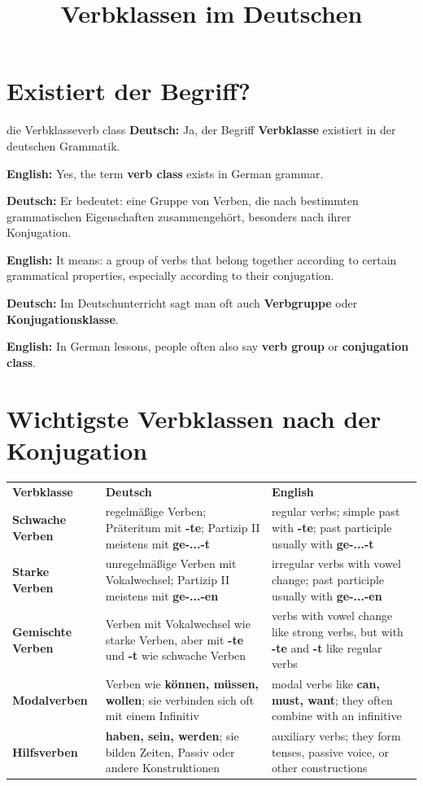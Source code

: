 \documentclass[a4paper,11pt]{article}
\title{Verbklassen im Deutschen}
\date{}
\newcommand{\GermanText}[1]{\textbf{Deutsch: }#1\par}
\newcommand{\EnglishText}[1]{{\small\color{SoftGray}\textbf{English: }#1\par}}
\begin{document}
    \maketitle
    \tableofcontents
    \newpage

\section{Existiert der Begriff?}

\begin{grammarentry}{die Verbklasse}{verb class}
\GermanText{Ja, der Begriff \textbf{Verbklasse} existiert in der deutschen Grammatik.}
\EnglishText{Yes, the term \textbf{verb class} exists in German grammar.}

\GermanText{Er bedeutet: eine Gruppe von Verben, die nach bestimmten grammatischen Eigenschaften zusammengehört, besonders nach ihrer Konjugation.}
\EnglishText{It means: a group of verbs that belong together according to certain grammatical properties, especially according to their conjugation.}

\GermanText{Im Deutschunterricht sagt man oft auch \textbf{Verbgruppe} oder \textbf{Konjugationsklasse}.}
\EnglishText{In German lessons, people often also say \textbf{verb group} or \textbf{conjugation class}.}
\end{grammarentry}

\section{Wichtigste Verbklassen nach der Konjugation}

\begin{tabularx}{\textwidth}{>{\bfseries}p{3.4cm}X X}
\rowcolor{HeaderBlueDark}
\color{white}\textbf{Verbklasse} & \color{white}\textbf{Deutsch} & \color{white}\textbf{English} \\
Schwache Verben & regelmäßige Verben; Präteritum mit \textbf{-te}; Partizip II meistens mit \textbf{ge-...-t} & regular verbs; simple past with \textbf{-te}; past participle usually with \textbf{ge-...-t} \\
Starke Verben & unregelmäßige Verben mit Vokalwechsel; Partizip II meistens mit \textbf{ge-...-en} & irregular verbs with vowel change; past participle usually with \textbf{ge-...-en} \\
Gemischte Verben & Verben mit Vokalwechsel wie starke Verben, aber mit \textbf{-te} und \textbf{-t} wie schwache Verben & verbs with vowel change like strong verbs, but with \textbf{-te} and \textbf{-t} like regular verbs \\
Modalverben & Verben wie \textbf{können, müssen, wollen}; sie verbinden sich oft mit einem Infinitiv & modal verbs like \textbf{can, must, want}; they often combine with an infinitive \\
Hilfsverben & \textbf{haben, sein, werden}; sie bilden Zeiten, Passiv oder andere Konstruktionen & auxiliary verbs; they form tenses, passive voice, or other constructions \\
\end{tabularx}
\end{document}
